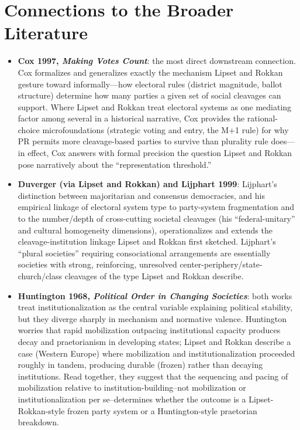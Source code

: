 \documentclass[12pt]{article}
\begin{document}
\section{Connections to the Broader Literature}

\begin{itemize}[leftmargin=*, itemsep=4pt]
    \item \textbf{Cox 1997, \textit{Making Votes Count}}: the most direct downstream connection. Cox formalizes and generalizes exactly the mechanism Lipset and Rokkan gesture toward informally---how electoral rules (district magnitude, ballot structure) determine how many parties a given set of social cleavages can support. Where Lipset and Rokkan treat electoral systems as one mediating factor among several in a historical narrative, Cox provides the rational-choice microfoundations (strategic voting and entry, the M+1 rule) for why PR permits more cleavage-based parties to survive than plurality rule does---in effect, Cox answers with formal precision the question Lipset and Rokkan pose narratively about the ``representation threshold.''
    \item \textbf{Duverger (via Lipset and Rokkan) and Lijphart 1999}: Lijphart's distinction between majoritarian and consensus democracies, and his empirical linkage of electoral system type to party-system fragmentation and to the number/depth of cross-cutting societal cleavages (his ``federal-unitary'' and cultural homogeneity dimensions), operationalizes and extends the cleavage-institution linkage Lipset and Rokkan first sketched. Lijphart's ``plural societies'' requiring consociational arrangements are essentially societies with strong, reinforcing, unresolved center-periphery/state-church/class cleavages of the type Lipset and Rokkan describe.
    \item \textbf{Huntington 1968, \textit{Political Order in Changing Societies}}: both works treat institutionalization as the central variable explaining political stability, but they diverge sharply in mechanism and normative valence. Huntington worries that rapid mobilization outpacing institutional capacity produces decay and praetorianism in developing states; Lipset and Rokkan describe a case (Western Europe) where mobilization and institutionalization proceeded roughly in tandem, producing durable (frozen) rather than decaying institutions. Read together, they suggest that the sequencing and pacing of mobilization relative to institution-building--not mobilization or institutionalization per se--determines whether the outcome is a Lipset-Rokkan-style frozen party system or a Huntington-style praetorian breakdown.

\end{itemize}
\end{document}
